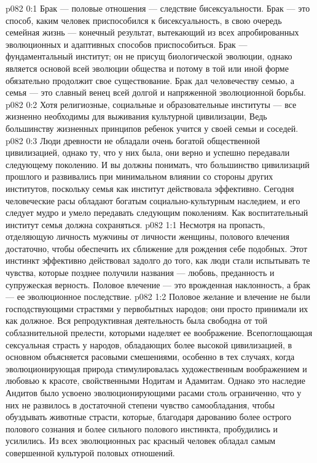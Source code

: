 \vs p082 0:1 Брак --- половые отношения --- следствие бисексуальности. Брак --- это способ, каким человек приспособился к бисексуальность, в свою очередь семейная жизнь --- конечный результат, вытекающий из всех апробированных эволюционных и адаптивных способов приспособиться. Брак --- фундаментальный институт; он не присущ биологической эволюции, однако является основой всей эволюции общества и потому в той или иной форме обязательно продолжит свое существование. Брак дал человечеству семью, а семья --- это славный венец всей долгой и напряженной эволюционной борьбы.
\vs p082 0:2 Хотя религиозные, социальные и образовательные институты --- все жизненно необходимы для выживания культурной цивилизации,  Ведь большинству жизненных принципов ребенок учится у своей семьи и соседей.
\vs p082 0:3 Люди древности не обладали очень богатой общественной цивилизацией, однако ту, что у них была, они верно и успешно передавали следующему поколению. И вы должны понимать, что большинство цивилизаций прошлого и развивались при минимальном влиянии со стороны других институтов, поскольку семья как институт действовала эффективно. Сегодня человеческие расы обладают богатым социально\hyp{}культурным наследием, и его следует мудро и умело передавать следующим поколениям. Как воспитательный институт семья должна сохраняться.
\vs p082 1:1 Несмотря на пропасть, отделяющую личность мужчины от личности женщины, полового влечения достаточно, чтобы обеспечить их сближение для рождения себе подобных. Этот инстинкт эффективно действовал задолго до того, как люди стали испытывать те чувства, которые позднее получили названия --- любовь, преданность и супружеская верность. Половое влечение --- это врожденная наклонность, а брак --- ее эволюционное последствие.
\vs p082 1:2 Половое желание и влечение не были господствующими страстями у первобытных народов; они просто принимали их как должное. Вся репродуктивная деятельность была свободна от той соблазнительной прелести, которыми наделяет ее воображение. Всепоглощающая сексуальная страсть у народов, обладающих более высокой цивилизацией, в основном объясняется расовыми смешениями, особенно в тех случаях, когда эволюционирующая природа стимулировалась художественным воображением и любовью к красоте, свойственными Нодитам и Адамитам. Однако это наследие Андитов было усвоено эволюционирующими расами столь ограниченно, что у них не развилось в достаточной степени чувство самообладания, чтобы обуздывать животные страсти, которые, благодаря дарованию более острого полового сознания и более сильного полового инстинкта, пробудились и усилились. Из всех эволюционных рас красный человек обладал самым совершенной культурой половых отношений.
